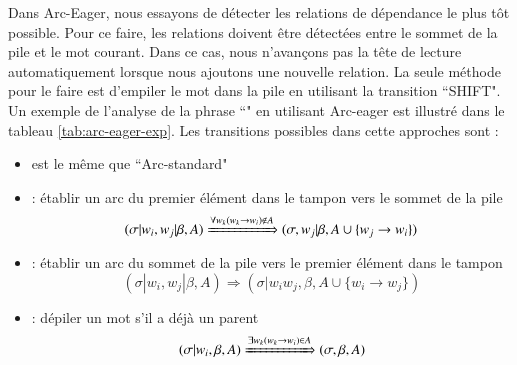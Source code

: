 \documentclass{KodeBook}
\begin{document}
Dans Arc-Eager, nous essayons de détecter les relations de dépendance le plus tôt possible. 
Pour ce faire, les relations doivent être détectées entre le sommet de la pile et le mot courant. 
Dans ce cas, nous n'avançons pas la tête de lecture automatiquement lorsque nous ajoutons une nouvelle relation. 
La seule méthode pour le faire est d'empiler le mot dans la pile en utilisant la transition ``SHIFT". 
Un exemple de l'analyse de la phrase ``" en utilisant Arc-eager est illustré dans le tableau \ref{tab:arc-eager-exp}.
Les transitions possibles dans cette approches sont :
\begin{itemize}
	\item {} est le même que ``Arc-standard"
	
	\item {} : établir un arc du premier élément dans le tampon vers le sommet de la pile
	\[ (\sigma|w_i, w_j|\beta, A) \xRightarrow{\forall w_k (w_k \rightarrow w_i) \notin A}  (\sigma, w_j|\beta, A \cup \{w_j \rightarrow w_i \}) \] 
	
	\item {} : établir un arc du sommet de la pile vers le premier élément dans le tampon
	\[ (\sigma|w_i, w_j|\beta, A) \Rightarrow  (\sigma|w_i w_j, \beta, A \cup \{w_i \rightarrow w_j \}) \] 
	
	\item {} : dépiler un mot s'il a déjà un parent
	\[ (\sigma|w_i, \beta, A) \xRightarrow{\exists w_k (w_k \rightarrow w_i) \in A} (\sigma, \beta, A) \] 
\end{itemize}
\end{document}
